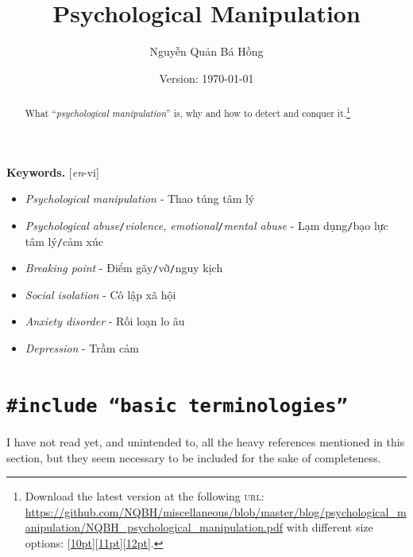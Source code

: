 \documentclass[12pt]{article}
\title{Psychological Manipulation}
\author{Nguyễn Quản Bá Hồng}
\date{\small\textsf{Version: \today}}
\numberwithin{equation}{section}
\begin{document}
\maketitle
\setcounter{secnumdepth}{6}
\setcounter{tocdepth}{6}


\begin{abstract}
    What ``\textit{psychological manipulation}'' is, why and how to detect and conquer it.\footnote{Download the latest version at the following \textsc{url}: \url{https://github.com/NQBH/miscellaneous/blob/master/blog/psychological_manipulation/NQBH_psychological_manipulation.pdf} with different size options: [\href{https://github.com/NQBH/miscellaneous/blob/master/blog/psychological_manipulation/NQBH_psychological_manipulation_size_10pt.pdf}{10pt}][\href{https://github.com/NQBH/miscellaneous/blob/master/blog/psychological_manipulation/NQBH_psychological_manipulation_size_11pt.pdf}{11pt}][\href{https://github.com/NQBH/miscellaneous/blob/master/blog/psychological_manipulation/NQBH_psychological_manipulation_size_12pt.pdf}{12pt}].}
\end{abstract}

\noindent
\textbf{Keywords.} [\textit{en}-vi]
\begin{itemize}
    \setlength\itemsep{0em}
    \item \textit{Psychological manipulation} - Thao túng tâm lý
    \item \textit{Psychological abuse}\texttt{/}\textit{violence, emotional}\texttt{/}\textit{mental abuse} - Lạm dụng\texttt{/}bạo lực tâm lý\texttt{/}cảm xúc
    \item \textit{Breaking point} - Điểm gãy\texttt{/}vỡ\texttt{/}nguy kịch
    \item \textit{Social isolation} - Cô lập xã hội
    \item \textit{Anxiety disorder} - Rối loạn lo âu
    \item \textit{Depression} - Trầm cảm
\end{itemize}

\tableofcontents

\section{\texttt{{\color{RubineRed}\#include} ``basic terminologies''}}
I have not read yet, and unintended to, all the heavy references mentioned in this section, but they seem necessary to be included for the sake of completeness.
\end{document}
